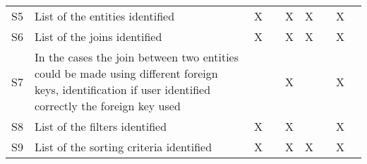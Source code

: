 \begin{longtable}{@{}lm{7cm}ccccccc@{}}
    S5          & List of the entities identified                                                                                                                         & X                                              &                                                & X                                              & X                                              &                                                & X                                              &                                                \\
    S6          & List of the joins identified                                                                                                                            & X                                              &                                                & X                                              & X                                              &                                                & X                                              &                                                \\
    S7          & In the cases the join between two entities could be made using different foreign keys, identification if user identified correctly the foreign key used &                                                &                                                & X                                              &                                                &                                                & X                                              &                                                \\
    S8          & List of the filters identified                                                                                                                          & X                                              &                                                & X                                              &                                                &                                                & X                                              &                                                \\
    S9          & List of the sorting criteria identified                                                                                                                 & X                                              &                                                & X                                              & X                                              &                                                & X                                              &                                                \\* \midrule

\end{longtable}
